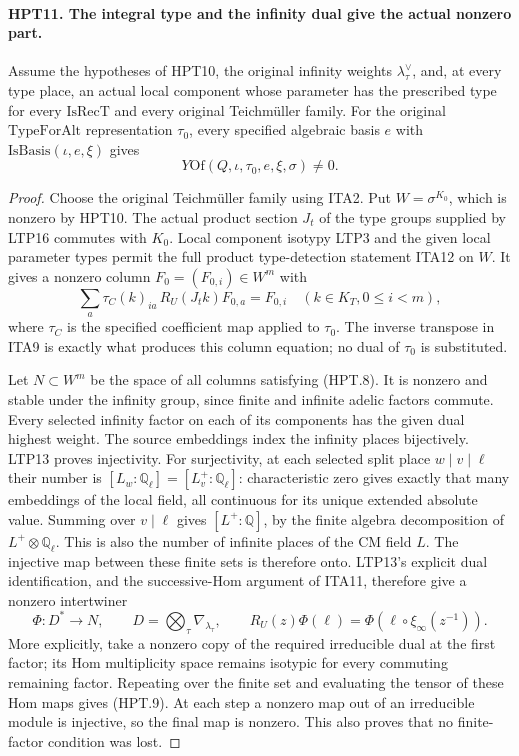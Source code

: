 \paragraph{HPT11. The integral type and the infinity dual give the actual nonzero part.}
\label{claim:HPT11}
Assume the hypotheses of HPT10, the original infinity weights
$\lambda_\tau^\vee$, and, at every type place, an actual local
component whose parameter has the prescribed type for every
$\mathrm{IsRecT}$ and every original Teichm\"uller family.
For the original $\mathrm{TypeForAlt}$ representation $\tau_0$,
every specified algebraic basis $e$ with $\mathrm{IsBasis}(\iota,e,\xi)$
gives
\[
                         Y\mathrm{Of}(Q,\iota,\tau_0,e,\xi,\sigma)\ne0.
                                                               \tag{HPT.7}
\]
\begin{proof}
Choose the original Teichm\"uller family using ITA2.  Put
$W=\sigma^{K_0}$, which is nonzero by HPT10.  The actual product
section $J_t$ of the type groups supplied by LTP16 commutes with
$K_0$.  Local component isotypy LTP3 and the given local parameter
types permit the full product type-detection statement ITA12 on
$W$.  It gives a nonzero column $F_0=(F_{0,i})\in W^m$ with
\[
       \sum_a\tau_C(k)_{ia}\,R_U(J_tk)F_{0,a}=F_{0,i}
                   \quad(k\in K_T, 0\leq i<m),                \tag{HPT.8}
\]
where $\tau_C$ is the specified coefficient map applied to
$\tau_0$.  The inverse transpose in ITA9 is exactly what produces
this column equation; no dual of $\tau_0$ is substituted.

Let $N\subset W^m$ be the space of all columns satisfying
(HPT.8).  It is nonzero and stable under the infinity group,
since finite and infinite adelic factors commute.  Every selected
infinity factor on each of its components has the given dual
highest weight.  The source embeddings index the infinity places
bijectively.  LTP13 proves injectivity.  For surjectivity, at each
selected split place $w\mid v\mid\ell$ their number is
$[L_w:\mathbb Q_\ell]=[L_v^+:\mathbb Q_\ell]$: characteristic
zero gives exactly that many embeddings of the local field,
all continuous for its unique extended absolute value.
Summing over $v\mid\ell$ gives $[L^+:\mathbb Q]$, by the
finite algebra decomposition of $L^+\otimes\mathbb Q_\ell$.
This is also the number of infinite places of the CM field $L$.
The injective map between these finite sets is therefore onto.
LTP13's explicit dual identification,
and the successive-Hom argument of ITA11, therefore give a
nonzero intertwiner
\[
       \Phi:D^*\longrightarrow N,\qquad
       D=\bigotimes_\tau\nabla_{\lambda_\tau},\qquad
       R_U(z)\Phi(\ell)=\Phi(\ell\circ\xi_\infty(z^{-1})).       \tag{HPT.9}
\]
More explicitly, take a nonzero copy of the required irreducible
dual at the first factor; its Hom multiplicity space remains
isotypic for every commuting remaining factor.  Repeating over
the finite set and evaluating the tensor of these Hom maps gives
(HPT.9).  At each step a nonzero map out of an irreducible module
is injective, so the final map is nonzero.  This also proves that
no finite-factor condition was lost.


\end{proof}
